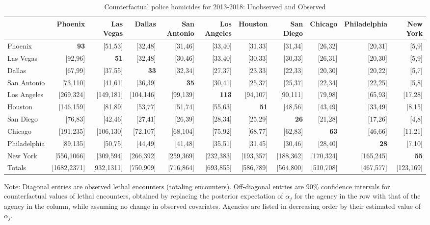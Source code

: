 \begin{table}[h!]\centering\scriptsize\tabcolsep=0.1cm\caption{Counterfactual police homicides for 2013-2018: Unobserved and Observed} \label{table:bootstrap_counterfactual_unobs_obs}\begin{tabular}{lrrrrrrrrrr}\hline \hline&Phoenix&Las Vegas&Dallas&San Antonio&Los Angeles&Houston&San Diego&Chicago&Philadelphia&New York\\
\hline
Phoenix&\textbf{93}&[51,53]&[32,48]&[31,46]&[33,40]&[31,33]&[31,34]&[26,32]&[20,31]&[5,9]\\
Las Vegas&[92,96]&\textbf{51}&[32,48]&[30,46]&[33,40]&[30,33]&[30,33]&[26,31]&[20,30]&[5,9]\\
Dallas&[67,99]&[37,55]&\textbf{33}&[32,34]&[27,37]&[23,33]&[22,33]&[20,30]&[20,22]&[5,7]\\
San Antonio&[73,110]&[41,61]&[36,39]&\textbf{35}&[30,41]&[25,37]&[25,37]&[22,34]&[22,25]&[5,8]\\
Los Angeles&[269,324]&[149,181]&[104,146]&[99,139]&\textbf{113}&[94,107]&[90,111]&[79,98]&[65,93]&[17,28]\\
Houston&[146,159]&[81,89]&[53,77]&[51,74]&[55,63]&\textbf{51}&[48,56]&[43,49]&[33,49]&[8,15]\\
San Diego&[76,83]&[42,46]&[27,41]&[26,39]&[28,34]&[25,29]&\textbf{26}&[21,28]&[17,26]&[4,8]\\
Chicago&[191,235]&[106,130]&[72,107]&[68,104]&[75,92]&[68,77]&[62,83]&\textbf{63}&[46,66]&[11,21]\\
Philadelphia&[89,135]&[50,75]&[44,49]&[41,48]&[35,51]&[31,45]&[30,46]&[28,40]&\textbf{28}&[7,10]\\
New York&[556,1066]&[309,594]&[266,392]&[259,369]&[232,383]&[193,357]&[188,362]&[170,324]&[165,245]&\textbf{55}\\
\hline
Totals&[1682,2371]&[932,1311]&[750,909]&[716,864]&[693,855]&[586,789]&[564,800]&[510,708]&[467,577]&[123,169]\\
\hline\end{tabular}\begin{center}\begin{minipage}{1.05\textwidth} %
 {\footnotesize {\schape Note}: Diagonal entries are observed lethal encounters (totaling \totalincidentsten{} encounters). Off-diagonal entries are 90\% confidence intervals for counterfactual values of lethal encounters, obtained by replacing the posterior expectation of $\alpha_j$ for the agency in the row with that of the agency in the column, while assuming no change in observed covariates. Agencies are listed in decreasing order by their estimated value of $\alpha_j$.} 
 \end{minipage} 
 \end{center} 
 \end{table} 
